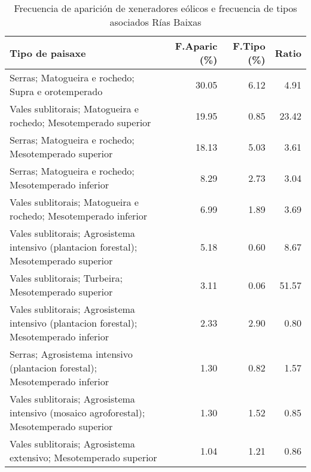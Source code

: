 \begin{table}[p]
\centering
\caption{Frecuencia de aparición de xeneradores eólicos e frecuencia de tipos asociados Rías Baixas} 
\label{veolico12}
\begin{tabular}{lrrr}
  \hline
Tipo de paisaxe & F.Aparic (\%) & F.Tipo (\%) & Ratio \\ 
  \hline
Serras; Matogueira e rochedo; Supra e orotemperado & 30.05 & 6.12 & 4.91 \\ 
  Vales sublitorais; Matogueira e rochedo; Mesotemperado superior & 19.95 & 0.85 & 23.42 \\ 
  Serras; Matogueira e rochedo; Mesotemperado superior & 18.13 & 5.03 & 3.61 \\ 
  Serras; Matogueira e rochedo; Mesotemperado inferior & 8.29 & 2.73 & 3.04 \\ 
  Vales sublitorais; Matogueira e rochedo; Mesotemperado inferior & 6.99 & 1.89 & 3.69 \\ 
  Vales sublitorais; Agrosistema intensivo (plantacion forestal); Mesotemperado superior & 5.18 & 0.60 & 8.67 \\ 
  Vales sublitorais; Turbeira; Mesotemperado superior & 3.11 & 0.06 & 51.57 \\ 
  Vales sublitorais; Agrosistema intensivo (plantacion forestal); Mesotemperado inferior & 2.33 & 2.90 & 0.80 \\ 
  Serras; Agrosistema intensivo (plantacion forestal); Mesotemperado inferior & 1.30 & 0.82 & 1.57 \\ 
  Vales sublitorais; Agrosistema intensivo (mosaico agroforestal); Mesotemperado superior & 1.30 & 1.52 & 0.85 \\ 
  Vales sublitorais; Agrosistema extensivo; Mesotemperado superior & 1.04 & 1.21 & 0.86 \\ 
   \hline
\end{tabular}
\end{table}
